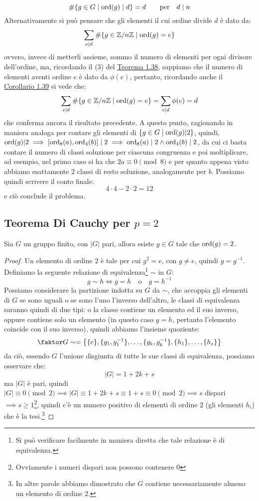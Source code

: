 \documentclass[11pt]{scrartcl}
\begin{document}
\begin{soln}
	\[ \#\{g \in G \mid \operatorname{ord}(g) \mid d\} = d \qquad \text{per}\quad d\mid n
	\]
Alternativamente si può pensare che gli elementi il cui ordine divide $d$ è dato da:
	\[ \sum_{e \mid d} \#\{g \in {\mathbb Z}/n{\mathbb Z} \mid \operatorname{ord}(g)=e\}
	\]
ovvero, invece di metterli assieme, sommo il numero di elementi per ogni divisore dell'ordine, ma, ricordando il (3) del \hyperref[g:ordiniZn]{Teorema 1.38}, sappiamo che il numero di elementi aventi ordine $e$ è dato da $\phi(e)$, pertanto, ricordando anche il \hyperref[sum]{Corollario 1.39} si vede che: 
	\[ \sum_{e \mid d} \#\{g \in {\mathbb Z}/n{\mathbb Z} \mid \operatorname{ord}(g)=e\} = \sum_{e \mid d} \phi(e) = d
 	\]
che conferma ancora il risultato precedente. A questo punto, ragionando in maniera analoga per contare gli elementi di $\{g \in G \mid \operatorname{ord}(g)|2\}$, quindi, 
$\operatorname{ord}(g)|2 \implies [\operatorname{ord}_8(a),\operatorname{ord}_4(b)] \mid 2 \implies \operatorname{ord}_8(a) \mid 2 \land \operatorname{ord}_4(b) \mid 2$, da cui ci basta contare il numero di classi soluzione per ciascuna congruenza e poi moltiplicare, ad esempio, nel primo caso si ha che $2a \equiv 0 \pmod 8$ e per quanto appena visto abbiamo esattamente $2$ classi di resto soluzione, analogamente per $b$. Possiamo quindi scrivere il conto finale:
	\[ 4\cdot4-2\cdot2 = 12
	\]
e ciò conclude il problema.
\end{soln}

\subsection{Teorema Di Cauchy per $p = 2$}

\begin{theorem}
[Teorema Di Cauchy per $p = 2$]
Sia $G$ un gruppo finito, con $|G|$ pari, allora esiste $g \in G$ tale che $\operatorname{ord}(g) = 2$.
\end{theorem}

\begin{proof}
Un elemento di ordine $2$ è tale per cui $g^2=e$, con $g \ne e$, quindi $g=g^{-1}$. Definiamo la seguente relazione di equivalenza\footnote{Si può verificare facilmente in maniera diretta che tale relazione è di equivalenza.} $\sim$ in $G$:
		\[ g \sim h \iff g = h \quad \text{o}\quad g = h^{-1}
	\]
Possiamo considerare la partizione indotta su $G$ da $\sim$, che accoppia gli elementi di $G$ se sono uguali o se sono l'uno l'inverso dell'altro, le classi di equivalenza saranno quindi di due tipi: o la classe contiene un elemento ed il suo inverso, oppure contiene solo un elemento (in questo caso $g=h$, pertanto l'elemento coincide con il suo inverso), quindi abbiamo l'insieme quoziente:
	\[ \faktor G\sim = \left\{\{e\}, \{g_1, g_1^{-1}\},\ldots, \{g_k, g_k^{-1}\}, \{h_1\}, \ldots, \{h_s\}\right\}
	\]
da ciò, essendo $G$ l'unione disgiunta di tutte le sue classi di equivalenza, possiamo osservare che:
	\[ |G| = 1 +2k +s
	\]
ma $|G|$ è pari, quindi $|G| \equiv 0 \pmod 2 \implies |G| \equiv 1+2k+s \equiv 1+s \equiv 0 \pmod 2 \implies s$ dispari $\implies s \geq 1$\footnote{Ovviamente i numeri dispari non possono contenere $0$}, quindi c'è un numero positivo di elementi di ordine $2$ (gli elementi $h_i$) che è la tesi.\footnote{In altre parole abbiamo dimostrato che $G$ contiene necessariamente almeno un elemento di ordine $2$.}
\end{proof}
\end{document}
